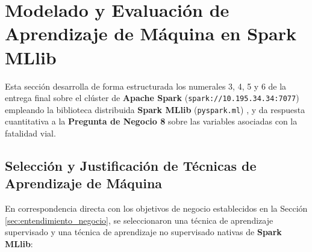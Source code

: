 \section{Modelado y Evaluación de Aprendizaje de Máquina en Spark MLlib}
\label{sec:modelado_evaluacion}

Esta sección desarrolla de forma estructurada los numerales 3, 4, 5 y 6 de la entrega final sobre el clúster de \textbf{Apache Spark} (\texttt{spark://10.195.34.34:7077}) empleando la biblioteca distribuida \textbf{Spark MLlib} (\texttt{pyspark.ml}) \cite{meng2016mllib}, y da respuesta cuantitativa a la \textbf{Pregunta de Negocio 8} sobre las variables asociadas con la fatalidad vial.

\subsection{Selección y Justificación de Técnicas de Aprendizaje de Máquina}
\label{subsec:seleccion_tecnicas_num3}

En correspondencia directa con los objetivos de negocio establecidos en la Sección \ref{sec:entendimiento_negocio}, se seleccionaron una técnica de aprendizaje supervisado y una técnica de aprendizaje no supervisado nativas de \textbf{Spark MLlib}:

